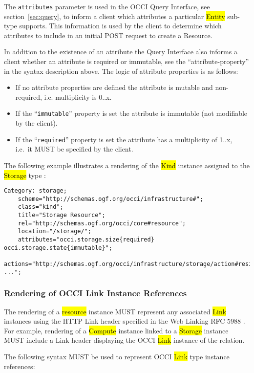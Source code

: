 \documentclass[10pt,a4paper]{article}
\begin{document}
The {\tt attributes} parameter is used in the OCCI Query Interface,
see section~\ref{sec:query}, to inform a client which attributes a
particular \hl{Entity} sub-type supports. This information is used by
the client to determine which attributes to include in an initial POST
request to create a Resource.

In addition to the existence of an attribute the Query Interface also
informs a client whether an attribute is required or immutable, see
the ``attribute-property'' in the syntax description above. The logic
of attribute properties is as follows:

\begin{itemize} 
  \item If no attribute properties are defined the attribute is
    mutable and non-required, i.e. multiplicity is 0..x.
  \item If the ``{\tt immutable}'' property is set the attribute is
    immutable (not modifiable by the client).
  \item If the ``{\tt required}'' property is set the attribute has a
    multiplicity of 1..x, i.e.~it MUST be specified by the client.
\end{itemize}

The following example illustrates a rendering of the \hl{Kind}
instance assigned to the \hl{Storage} type \cite{occi:infrastructure}:

\begin{verbatim}
Category: storage;
    scheme="http://schemas.ogf.org/occi/infrastructure#";
    class="kind";
    title="Storage Resource";
    rel="http://schemas.ogf.org/occi/core#resource";
    location="/storage/";
    attributes="occi.storage.size{required} occi.storage.state{immutable}";
    actions="http://schemas.ogf.org/occi/infrastructure/storage/action#resize ...";
\end{verbatim}

\subsubsection{Rendering of OCCI Link Instance References}
The rendering of a \hl{resource} instance \cite{occi:core} MUST
represent any associated \hl{Link} instances using the HTTP Link
header specified in the Web Linking RFC 5988 \cite{rfc5988}.  For
example, rendering of a \hl{Compute} instance linked to a \hl{Storage}
instance MUST include a Link header displaying the OCCI \hl{Link}
instance of the relation.

The following syntax MUST be used to represent OCCI \hl{Link} type
instance references:
\end{document}

